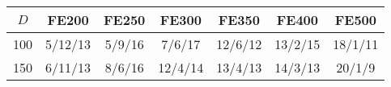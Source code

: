 \begin{tabular}{c c c c c c c}\hline\hline
	$D$	&	FE200	&	FE250	&	FE300	&	FE350	&	FE400	&	FE500	\\ \hline
	100	&	5/12/13	&	5/9/16	&	7/6/17	&	12/6/12	&	13/2/15	&	18/1/11	\\
	150	&	6/11/13	&	8/6/16	&	12/4/14	&	13/4/13	&	14/3/13	&	20/1/9	\\ \hline
	\end{tabular}
	